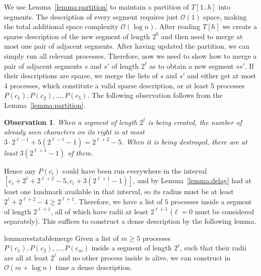 \documentclass{article}[11pt,letter]
\newtheorem{observation}[definition]{Observation}
\newcommand{\bigo}{\mathcal{O}}
\newcommand{\head}{h}
\begin{document}
We use Lemma~\ref{lemma:partition} to maintain a partition of $T[1..\head]$ into segments. The description of every segment requires
just $\bigo(1)$ space, making the total additional space complexity $\bigo(\log n)$. 
After reading $T[\head]$ we create a sparse
description of the new segment of length $2^{0}$ and then need to merge at most one pair of adjacent segments. After having updated the
partition, we can simply run all relevant processes.
Therefore, now we need to show how to merge a pair of adjacent segments $s$ and $s'$ of length
$2^{\ell}$ as to obtain a new segment $ss'$. If their descriptions are sparse, we merge the lists of $s$ and $s'$ and either get at most $4$ processes, which constitute a valid sparse description,
or at least $5$ processes $P(c_{1}),P(c_{2}),\ldots,P(c_{5})$. The following observation follows from the Lemma~\ref{lemma:partition}.

\begin{observation}
\label{obs:lifespan}
When a segment of length $2^{\ell}$ is being created, the number of already seen characters on its right is at most
$3\cdot 2^{\ell-1}+5(2^{\ell-1}-1)=2^{\ell+2}-5$.
When it is being destroyed, there are at least $3(2^{\ell+1}-1)$ of them.
\end{observation}

Hence any $P(c_{i})$ could have been run everywhere in the interval $[c_{i}+2^{\ell}+2^{\ell+2}-5,c_{i}+3(2^{\ell+1}-1)]$,
and by Lemma~\ref{lemma:delay} had at least one landmark available in that interval,
so its radius must be at least $2^{\ell}+2^{\ell+2}-4\geq 2^{\ell+1}$. Therefore, we have a list of $5$ processes inside a segment of length
$2^{\ell+1}$, all of which have radii at least $2^{\ell+1}$ ($\ell=0$ must be considered separately).
This suffices to construct a dense description by the following lemma.

\begin{restatable}{lemma}{restatablemerge}
\label{lemma:merge}
Given a list of $m\geq 5$ processes $P(c_{1}),P(c_{2}),\ldots,P(c_{m})$ inside a segment of length $2^{\ell}$, such that their radii are all at least $2^{\ell}$
and no other process inside is alive, we can construct in $\bigo(m+\log n)$ time a dense description.
\end{restatable}
\end{document}
